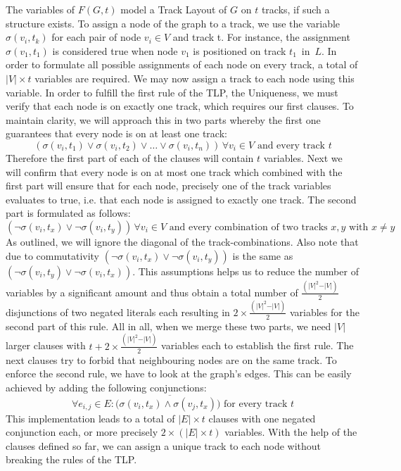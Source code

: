 \documentclass[bachelor, english]{algothesis}
\begin{document}
The variables of $F(G, t)$ model a Track Layout of $G$ on $t$ tracks, if such a structure exists. To assign a node of the graph to a track, we use the variable $\sigma(v_i,t_k)$ for each pair of node $v_i \in V$ and track t. For instance, the assignment $\sigma(v_1, t_1)$ is considered true when node $v_1$ is positioned on track $t_1 \,$ in $\, L$. In order to formulate all possible assignments of each node on every track, a total of $ \vert V \vert \times t$ variables are required. We may now assign a track to each node using this variable. In order to fulfill the first rule of the TLP, the Uniqueness, we must verify that each node is on exactly one track, which requires our first clauses. To maintain clarity, we will approach this in two parts whereby the first one guarantees that every node is on at least one track:
    $$ (\sigma(v_i,t_1) \lor \sigma(v_i,t_2) \lor \dots \lor \sigma(v_i,t_n)) \, \forall v_i \in V \text{ and every track }t $$
Therefore the first part of each of the clauses will contain $t$ variables. Next we will confirm that every node is on at most one track which combined with the first part will ensure that for each node, precisely one of the track variables evaluates to true, i.e. that each node is assigned to exactly one track. The second part is formulated as follows:
    $$ (\lnot\sigma(v_i, t_x) \lor \lnot\sigma(v_i, t_y)) \, \forall v_i \in V \text{ and every combination of two tracks } x, y \text{ with } x \neq y$$
\noindent
As outlined, we will ignore the diagonal of the track-combinations. Also note that due to commutativity $(\lnot \sigma(v_i, t_x) \lor \lnot \sigma(v_i, t_y))$ is the same as $(\lnot \sigma(v_i, t_y) \lor \lnot \sigma(v_i, t_x))$. This assumptions helps us to reduce the number of variables by a significant amount and thus obtain a total number of $\frac{(\vert V \vert^2-\vert V \vert)}{2}$ disjunctions of two negated literals each resulting in $2 \times \frac{(\vert V \vert^2-\vert V \vert)}{2}$ variables for the second part of this rule. All in all, when we merge these two parts, we need $\vert V \vert$ larger clauses with $t + 2 \times \frac{(\vert V \vert^2-\vert V \vert)}{2}$ variables each to establish the first rule. The next clauses try to forbid that neighbouring nodes are on the same track. To enforce the second rule, we have to look at the graph's edges. This can be easily achieved by adding the following conjunctions:
        $$ \forall e_{i,j} \in E : (\overline{\sigma(v_i,t_x) \land \sigma(v_j,t_x))} \text{ for every track } t $$
This implementation leads to a total of $\vert E \vert \times t$ clauses with one negated conjunction each, or more precisely $2 \times (\vert E \vert \times t)$ variables. With the help of the clauses defined so far, we can assign a unique track to each node without breaking the rules of the TLP.
\end{document}
